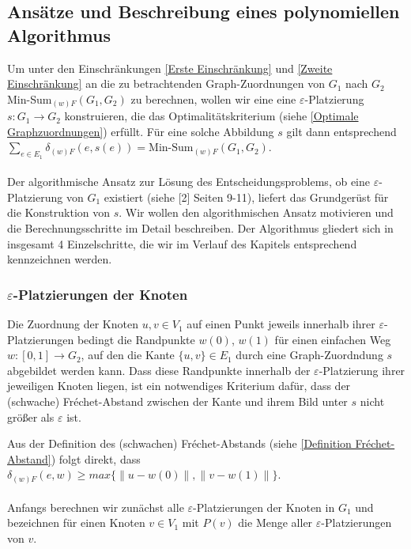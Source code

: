 \documentclass[a4paper, 12pt, twoside]{article}
\theoremstyle{Format1} %
\begin{document}
\subsection{Ansätze und Beschreibung eines polynomiellen Algorithmus} \label{Grundidee des Algorithmus}
Um unter den Einschränkungen \ref{Erste Einschränkung} und \ref{Zweite Einschränkung} an die zu betrachtenden Graph-Zuordnungen von $G_1$ nach $G_2$
Min-Sum$_{(w)F}(G_1,G_2)$ zu berechnen, wollen wir eine
eine $\varepsilon$-Platzierung $s: G_1 \to G_2$ konstruieren, die das Optimalitätskriterium (siehe \ref{Optimale Graphzuordnungen}) erfüllt.
Für eine solche Abbildung $s$ gilt dann entsprechend $\sum_{e \in E_1}\delta_{(w)F}(e, s(e)) = \text{Min-Sum}_{(w)F}(G_1,G_2)$.
\\
\\
Der algorithmische Ansatz zur Lösung des Entscheidungsproblems, ob eine $\varepsilon$-Platzierung von $G_1$ existiert (siehe [2] Seiten 9-11), liefert das
Grundgerüst für die Konstruktion von $s$. Wir wollen den algorithmischen Ansatz motivieren und die Berechnungsschritte im Detail beschreiben.
Der Algorithmus gliedert sich in insgesamt 4 Einzelschritte, die wir im Verlauf des Kapitels entsprechend kennzeichnen werden.

\subsubsection{$\varepsilon$-Platzierungen der Knoten} \label{Platzierungen der Knoten}
Die Zuordnung der Knoten $u,v \in V_1$ auf einen Punkt jeweils innerhalb ihrer $\varepsilon$-Platzierungen bedingt die Randpunkte $w(0)$, $w(1)$
für einen einfachen Weg $w: [0,1] \to G_2$, auf den die Kante $\{u,v\} \in E_1$ durch eine Graph-Zuordndung $s$ abgebildet werden kann.
Dass diese Randpunkte innerhalb der $\varepsilon$-Platzierung ihrer jeweiligen Knoten liegen, ist ein notwendiges Kriterium dafür, dass der (schwache) Fréchet-Abstand
zwischen der Kante und ihrem Bild unter $s$ nicht größer als $\varepsilon$ ist.

Aus der Definition des (schwachen) Fréchet-Abstands (siehe \ref{Definition Fréchet-Abstand}) folgt direkt, dass
$\delta_{(w)F}(e, w) \geq max{\{\|u-w(0)\|, \|v-w(1)\|\}}$.
\\
\\
Anfangs berechnen wir zunächst alle $\varepsilon$-Platzierungen der Knoten in $G_1$ und bezeichnen für einen Knoten $v \in V_1$ mit $P(v)$ die Menge
aller $\varepsilon$-Platzierungen von $v$.
\end{document}
